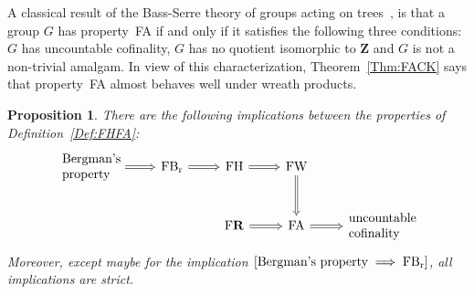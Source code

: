 \documentclass[a4paper]{article}
\newcommand{\PH}[1]{\todo[color={blue!33},size=small]{\textbf{PH :} #1}}
\newtheorem{prop}[lem]{Proposition}
\theoremstyle{definition}
\newcommand*{\field}[1]{\mathbf{#1}}
\newcommand*{\Z}{\field{Z}}
\newcommand*{\FB}{FB\textsubscript{r}}
\newcommand*{\FH}{FH}
\newcommand*{\FW}{FW}
\newcommand*{\FA}{FA}
\newcommand*{\FR}{F\textbf{R}}
\begin{document}
A classical result of the Bass-Serre theory of groups acting on trees~\cite{MR0476875}, is that a group $G$ has property~\FA{} if and only if it satisfies the following three conditions: $G$ has uncountable cofinality, $G$ has no quotient isomorphic to $\Z$ and $G$ is not a non-trivial amalgam.
In view of this characterization, Theorem~\ref{Thm:FACK} says that property~\FA{} almost behaves well under wreath products.
%
%
\begin{prop}
There are the following implications between the properties of Definition~\ref{Def:FHFA}:
\[
\begin{tikzcd}[arrows=Rightarrow]
\parbox{4.5em}{\textnormal{Bergman's property}}\arrow[r]	&\textnormal{\FB} \arrow[r]	&\textnormal{\FH} \arrow[r]	&\textnormal{\FW}\arrow[d] &\\%
&&\textnormal{\FR}\arrow[r]& \textnormal{\FA} \arrow[r]& \parbox{5em}{\textnormal{uncountable cofinality}}
\end{tikzcd}
\]
Moreover, except maybe for the implication $[\textnormal{Bergman's property}\implies\textnormal{\FB}]$, all implications are strict.%
\end{prop}
\end{document}
